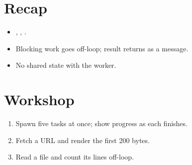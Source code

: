 \section{Recap}

\begin{recap}
\begin{itemize}[leftmargin=*]
  \item {}, , .
  \item Blocking work goes off-loop; result returns as a
    message.
  \item No shared state with the worker.
\end{itemize}
\end{recap}

\section*{Workshop}

\begin{enumerate}[leftmargin=*]
  \item Spawn five tasks at once; show progress as each
    finishes.
  \item Fetch a URL and render the first 200 bytes.
  \item Read a file and count its lines off-loop.
\end{enumerate}
